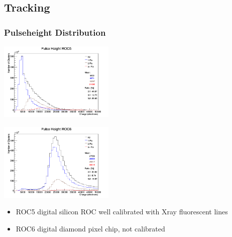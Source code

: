 \documentclass[9pt]{beamer}
\begin{document}
\subsection{Tracking}
\begin{frame}
	\frametitle{Pulseheight Distribution}
	\begin{center}
		\begin{minipage}{5.5cm}
			\centering
			\includegraphics[width=5.5cm]{Pics/PulseHeight_ROC5}
		\end{minipage}
		\hspace*{2pt}
		\begin{minipage}{5.5cm}
			\centering
			\includegraphics[width=5.5cm]{Pics/PulseHeight_ROC6}
		\end{minipage}\no\s
		\begin{itemize}
		\item ROC5 digital silicon ROC well calibrated with Xray fluorescent lines
		\item ROC6 digital diamond pixel chip, not calibrated
	\end{itemize}
	\end{center}
\end{frame}
\end{document}
